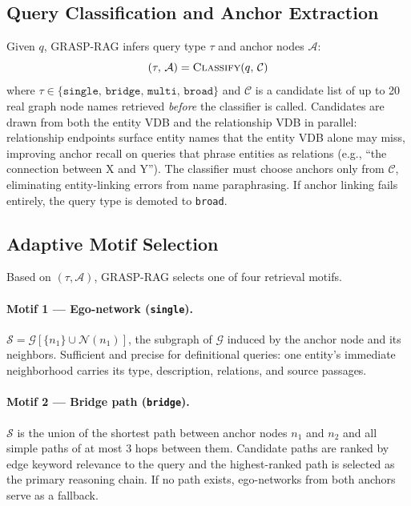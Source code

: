 \subsection{Query Classification and Anchor Extraction}
\label{sec:classify}

Given $q$, GRASP-RAG infers query type $\tau$ and anchor nodes $\mathcal{A}$:
\begin{equation*}
  (\tau,\, \mathcal{A}) = \textsc{Classify}(q,\, \mathcal{C})
\end{equation*}
where $\tau \in \{\texttt{single},\, \texttt{bridge},\, \texttt{multi},\,
\texttt{broad}\}$ and $\mathcal{C}$ is a candidate list of up to 20 real graph
node names retrieved \emph{before} the classifier is called.
Candidates are drawn from both the entity VDB and the relationship VDB in
parallel: relationship endpoints surface entity names that the entity VDB alone
may miss, improving anchor recall on queries that phrase entities as relations
(e.g., ``the connection between X and Y'').
The classifier must choose anchors only from $\mathcal{C}$, eliminating
entity-linking errors from name paraphrasing.
If anchor linking fails entirely, the query type is demoted to
\texttt{broad}.

\subsection{Adaptive Motif Selection}
\label{sec:motif}

Based on $(\tau, \mathcal{A})$, GRASP-RAG selects one of four retrieval motifs.

\paragraph{Motif 1 — Ego-network (\texttt{single}).}
$\mathcal{S} = \mathcal{G}[\{n_1\} \cup \mathcal{N}(n_1)]$, the subgraph of
$\mathcal{G}$ induced by the anchor node and its neighbors.
Sufficient and precise for definitional queries: one entity's immediate
neighborhood carries its type, description, relations, and source passages.

\paragraph{Motif 2 — Bridge path (\texttt{bridge}).}
$\mathcal{S}$ is the union of the shortest path between anchor nodes $n_1$ and
$n_2$ and all simple paths of at most 3 hops between them.
Candidate paths are ranked by edge keyword relevance to the query and the
highest-ranked path is selected as the primary reasoning chain.
If no path exists, ego-networks from both anchors serve as a fallback.

